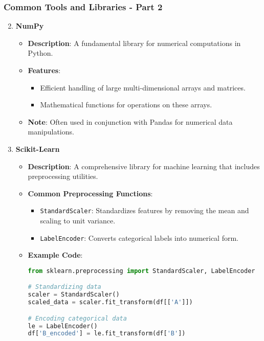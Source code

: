 \documentclass{beamer}
\begin{document}
\begin{frame}[fragile]
    \frametitle{Common Tools and Libraries - Part 2}
    \begin{enumerate}
        \setcounter{enumi}{1}
        \item \textbf{NumPy}
            \begin{itemize}
                \item \textbf{Description}: A fundamental library for numerical computations in Python.
                \item \textbf{Features}:
                    \begin{itemize}
                        \item Efficient handling of large multi-dimensional arrays and matrices.
                        \item Mathematical functions for operations on these arrays.
                    \end{itemize}
                \item \textbf{Note}: Often used in conjunction with Pandas for numerical data manipulations.
            \end{itemize}
            
        \item \textbf{Scikit-Learn}
            \begin{itemize}
                \item \textbf{Description}: A comprehensive library for machine learning that includes preprocessing utilities.
                \item \textbf{Common Preprocessing Functions}:
                    \begin{itemize}
                        \item \texttt{StandardScaler}: Standardizes features by removing the mean and scaling to unit variance.
                        \item \texttt{LabelEncoder}: Converts categorical labels into numerical form.
                    \end{itemize}
                \item \textbf{Example Code}:
                    \begin{lstlisting}[language=Python]
from sklearn.preprocessing import StandardScaler, LabelEncoder

# Standardizing data
scaler = StandardScaler()
scaled_data = scaler.fit_transform(df[['A']])

# Encoding categorical data
le = LabelEncoder()
df['B_encoded'] = le.fit_transform(df['B'])
                    \end{lstlisting}
            \end{itemize}
    \end{enumerate}
\end{frame}
\end{document}
